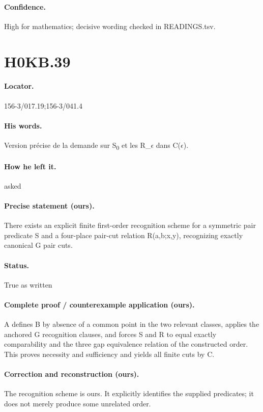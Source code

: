 \paragraph{Confidence.} High for mathematics; decisive wording checked in READINGS.tsv.

\section*{H0KB.39}\label{statement:H0KB.39}
\paragraph{Locator.} 156-3/017.19;156-3/041.4

\paragraph{His words.} Version précise de la demande sur S\textsubscript{0} et les R\_\ensuremath{\epsilon} dans C(\ensuremath{\epsilon}).

\paragraph{How he left it.} asked

\paragraph{Precise statement (ours).} There exists an explicit finite first-order recognition scheme for a symmetric pair predicate S and a four-place pair-cut relation R(a,b;x,y), recognizing exactly canonical G pair cuts.

\paragraph{Status.} True as written

\paragraph{Complete proof / counterexample application (ours).} A defines B by absence of a common point in the two relevant classes, applies the anchored G recognition clauses, and forces S and R to equal exactly comparability and the three gap equivalence relation of the constructed order. This proves necessity and sufficiency and yields all finite cuts by C.

\paragraph{Correction and reconstruction (ours).} The recognition scheme is ours. It explicitly identifies the supplied predicates; it does not merely produce some unrelated order.

